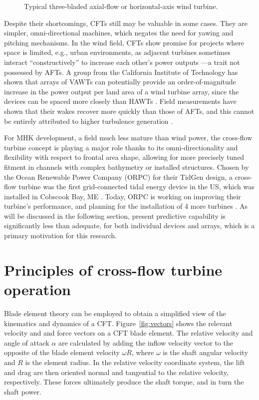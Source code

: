 \begin{figure}[ht]
\caption{Typical three-bladed axial-flow or horizontal-axis wind turbine.}
\label{fig:AFT}
\end{figure}

Despite their shortcomings, CFTs still may be valuable in some cases. They are
simpler, omni-directional machines, which negates the need for yawing and
pitching mechanisms. In the wind field, CFTs show promise for projects where
space is limited, e.g., urban environments, as adjacent turbines sometimes
interact ``constructively'' to increase each other's power outputs
\cite{Li2010}---a trait not possessed by AFTs. A group from the California
Institute of Technology has shown that arrays of VAWTs can potentially provide
an order-of-magnitude increase in the power output per land area of a wind
turbine array, since the devices can be spaced more closely than HAWTs
\cite{Dabiri2011}. Field measurements have shown that their wakes recover more
quickly than those of AFTs, and this cannot be entirely attributed to higher
turbulence generation \cite{Kinzel2012}.

For MHK development, a field much less mature than wind power, the cross-flow
turbine concept is playing a major role thanks to its omni-directionality and
flexibility with respect to frontal area shape, allowing for more precisely
tuned fitment in channels with complex bathymetry or installed structures.
Chosen by the Ocean Renewable Power Company (ORPC) for their TidGen design, a
cross-flow turbine was the first grid-connected tidal energy device in the US,
which was installed in Cobscook Bay, ME \cite{ORPC2012}. Today, ORPC is working
on improving their turbine's performance, and planning for the installation of 4
more turbines \cite{Nelson2013}. As will be discussed in the following section,
present predictive capability is significantly less than adequate, for both
individual devices and arrays, which is a primary motivation for this research.


\section{Principles of cross-flow turbine operation}

Blade element theory can be employed to obtain a simplified view of the
kinematics and dynamics of a CFT. Figure~\ref{fig:vectors} shows the relevant
velocity and and force vectors on a CFT blade element. The relative velocity and
angle of attack $\alpha$ are calculated by adding the inflow velocity vector to
the opposite of the blade element velocity $\omega R$, where $\omega$ is the
shaft angular velocity and $R$ is the element radius. In the relative velocity
coordinate system, the lift and drag are then oriented normal and tangential to
the relative velocity, respectively. These forces ultimately produce the shaft
torque, and in turn the shaft power. 

